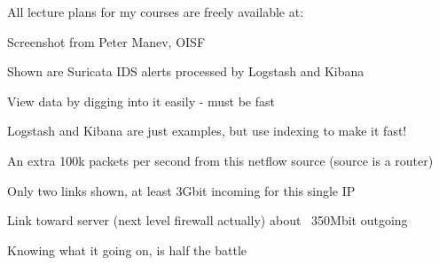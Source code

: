 \documentclass[Screen16to9,17pt]{foils}
\begin{document}
All lecture plans for my courses are freely available at:







\vskip 2cm
\begin{list2}
\item Screenshot from Peter Manev, OISF
\item Shown are Suricata IDS alerts processed by Logstash and Kibana
\end{list2}







\begin{list1}
\item View data by digging into it easily - must be fast
\item Logstash and Kibana are just examples, but use indexing to make it fast!
\end{list1}











\centerline{An extra 100k packets per second from this netflow source (source is a router)}



\centerline{Only two links shown, at least 3Gbit incoming for this single IP}


\begin{list1}
\item Link toward server (next level firewall actually) about ~350Mbit outgoing
\item Knowing what it going on, is half the battle
\end{list1}
\end{document}
